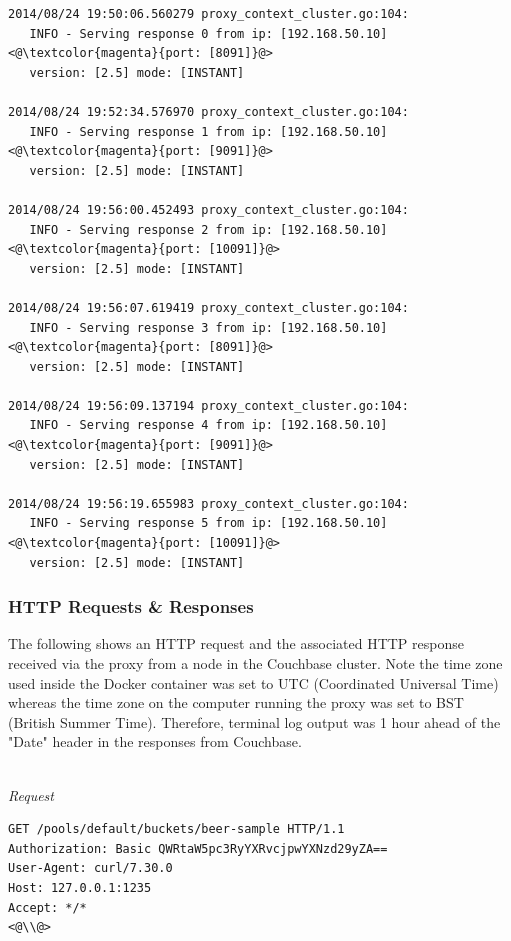 \documentclass[a4paper,11pt,twoside]{report}
\begin{document}
\begin{lstlisting}[language=terminal]
2014/08/24 19:50:06.560279 proxy_context_cluster.go:104:     
   INFO - Serving response 0 from ip: [192.168.50.10] <@\textcolor{magenta}{port: [8091]}@> 
   version: [2.5] mode: [INSTANT]

2014/08/24 19:52:34.576970 proxy_context_cluster.go:104:     
   INFO - Serving response 1 from ip: [192.168.50.10] <@\textcolor{magenta}{port: [9091]}@> 
   version: [2.5] mode: [INSTANT]

2014/08/24 19:56:00.452493 proxy_context_cluster.go:104:     
   INFO - Serving response 2 from ip: [192.168.50.10] <@\textcolor{magenta}{port: [10091]}@> 
   version: [2.5] mode: [INSTANT]

2014/08/24 19:56:07.619419 proxy_context_cluster.go:104:     
   INFO - Serving response 3 from ip: [192.168.50.10] <@\textcolor{magenta}{port: [8091]}@> 
   version: [2.5] mode: [INSTANT]

2014/08/24 19:56:09.137194 proxy_context_cluster.go:104:     
   INFO - Serving response 4 from ip: [192.168.50.10] <@\textcolor{magenta}{port: [9091]}@> 
   version: [2.5] mode: [INSTANT]

2014/08/24 19:56:19.655983 proxy_context_cluster.go:104:     
   INFO - Serving response 5 from ip: [192.168.50.10] <@\textcolor{magenta}{port: [10091]}@> 
   version: [2.5] mode: [INSTANT]
\end{lstlisting}

\subsubsection*{HTTP Requests \& Responses} 
The following shows an HTTP request and the associated HTTP response received via the proxy from a node in the Couchbase cluster.  Note the time zone used inside the Docker container was set to UTC (Coordinated Universal Time) whereas the time zone on the computer running the proxy was set to BST (British Summer Time). Therefore, terminal log output was 1 hour ahead of the "Date" header in the responses from Couchbase.

\noindent\\
\textit{Request}
\begin{lstlisting}[language=terminal]
GET /pools/default/buckets/beer-sample HTTP/1.1
Authorization: Basic QWRtaW5pc3RyYXRvcjpwYXNzd29yZA==
User-Agent: curl/7.30.0
Host: 127.0.0.1:1235
Accept: */*
<@\\@>
\end{lstlisting}
\end{document}
